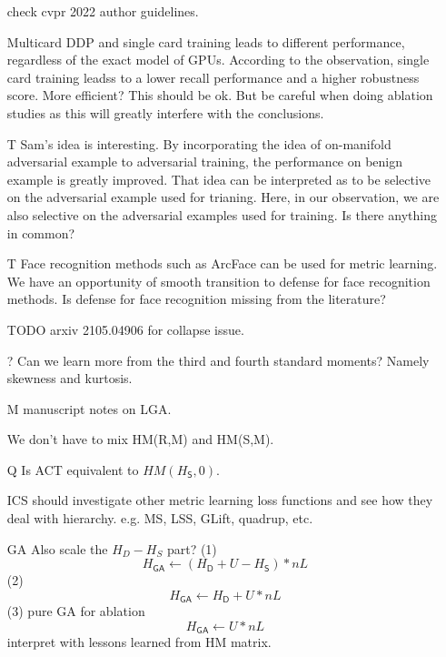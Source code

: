 \begin{itemize}
	
	\item [\cmark] check cvpr 2022 author guidelines.

	\item [\xmark] Multicard DDP and single card training leads to different
		performance, regardless of the exact model of GPUs.
		According to the observation, single card training leadss to a lower
		recall performance and a higher robustness score.
		More efficient? This should be ok.
		But be careful when doing ablation studies as this will greatly
		interfere with the conclusions.
	
	\item [T] Sam's idea is interesting. By incorporating the idea of
		on-manifold adversarial example to adversarial training, the
		performance on benign example is greatly improved.
		That idea can be interpreted as to be selective on the adversarial
		example used for trianing.
		Here, in our observation, we are also selective on the adversarial
		examples used for training.
		Is there anything in common?

	\item [T] Face recognition methods such as ArcFace can be used for
		metric learning.
		We have an opportunity of smooth transition to defense for face
		recognition methods.
		Is defense for face recognition missing from the literature?

	\item [TODO] arxiv 2105.04906 for collapse issue.

	\item [?] Can we learn more from the third and fourth standard moments?
		Namely skewness and kurtosis.
	
	\item [M] manuscript notes on LGA.

	\item [\cmark] We don't have to mix HM(R,M) and HM(S,M).

	\item [Q] Is ACT equivalent to $HM(H_\mathsf{S},0)$.

	\item [ICS] should investigate other metric learning loss functions and see
		how they deal with hierarchy. e.g. MS, LSS, GLift, quadrup, etc.

	\item [GA] Also scale the $H_D-H_S$ part?
		(1) $$ H_\mathsf{GA} \leftarrow (H_\mathsf{D} + U - H_\mathsf{S}) * nL $$
		(2) $$ H_\mathsf{GA} \leftarrow H_\mathsf{D} + U * nL $$
		(3) pure GA for ablation $$ H_\mathsf{GA} \leftarrow U * nL $$
		interpret with lessons learned from HM matrix.


\end{itemize}
